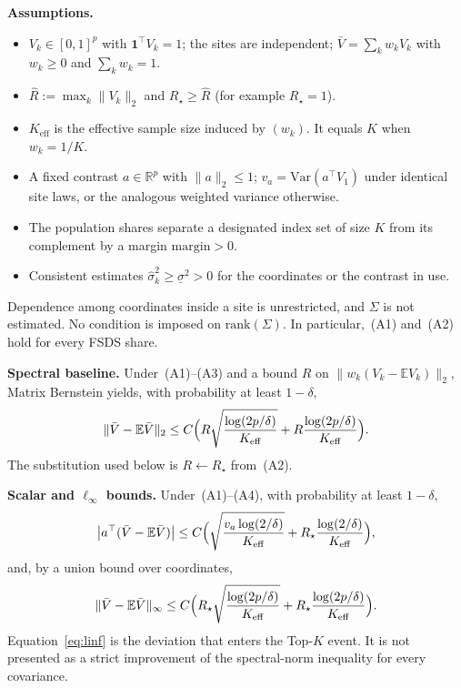 \par\noindent\textbf{Assumptions.}
\begin{itemize}
\item[(A1)] \(V_k\in[0,1]^p\) with \(\mathbf{1}^{\top}V_k=1\);
  the sites are independent;
  \(\bar V=\sum_k w_k V_k\) with \(w_k\ge 0\) and \(\sum_k w_k=1\).
\item[(A2)] \(\hat R:=\max_k\|V_k\|_2\) and \(R_{\star}\ge\hat R\)
  (for example \(R_{\star}=1\)).
\item[(A3)] \(K_{\mathrm{eff}}\) is the effective sample size induced by
  \((w_k)\). It equals \(K\) when \(w_k=1/K\).
\item[(A4)] A fixed contrast \(a\in\mathbb{R}^p\) with \(\|a\|_2\le 1\);
  \(v_a=\mathrm{Var}(a^{\top}V_1)\) under identical site laws, or the
  analogous weighted variance otherwise.
\item[(A5)] The population shares separate a designated index set of size
  \(K\) from its complement by a margin \(\mathrm{margin}>0\).
\item[(A6)] Consistent estimates
  \(\hat\sigma_k^2\ge\underline\sigma^2>0\) for the coordinates or the
  contrast in use.
\end{itemize}
Dependence among coordinates inside a site is unrestricted, and \(\Sigma\)
is not estimated.
No condition is imposed on \(\mathrm{rank}(\Sigma)\).
In particular,~(A1) and~(A2) hold for every FSDS share.

\par\noindent\textbf{Spectral baseline.}
Under~(A1)--(A3) and a bound \(R\) on
\(\|w_k(V_k-\mathbb{E}V_k)\|_2\), Matrix Bernstein
\cite{tropp2012user,mackey2014matrix} yields, with probability at least
\(1-\delta\),
\[
\|\bar V-\mathbb{E}\bar V\|_2
\le
C\Bigl(
R\sqrt{\frac{\log(2p/\delta)}{K_{\mathrm{eff}}}}
+
R\frac{\log(2p/\delta)}{K_{\mathrm{eff}}}
\Bigr).
\]
The substitution used below is \(R\leftarrow R_{\star}\) from~(A2).

\par\noindent\textbf{Scalar and \(\ell_\infty\) bounds.}
Under~(A1)--(A4), with probability at least \(1-\delta\),
\begin{equation}
\label{eq:scalar}
\bigl|a^{\top}(\bar V-\mathbb{E}\bar V)\bigr|
\le
C\Bigl(
\sqrt{\frac{v_a\log(2/\delta)}{K_{\mathrm{eff}}}}
+
R_{\star}\frac{\log(2/\delta)}{K_{\mathrm{eff}}}
\Bigr),
\end{equation}
and, by a union bound over coordinates,
\begin{equation}
\label{eq:linf}
\|\bar V-\mathbb{E}\bar V\|_{\infty}
\le
C\Bigl(
R_{\star}\sqrt{\frac{\log(2p/\delta)}{K_{\mathrm{eff}}}}
+
R_{\star}\frac{\log(2p/\delta)}{K_{\mathrm{eff}}}
\Bigr).
\end{equation}
Equation~\eqref{eq:linf} is the deviation that enters the Top-\(K\) event.
It is not presented as a strict improvement of the spectral-norm
inequality for every covariance.

